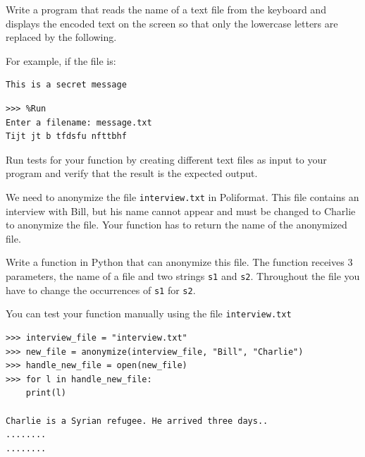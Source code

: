 \begin{exercise}
Write a program that reads the name of a text file from the keyboard and displays the encoded text on the screen so that only the lowercase letters are replaced by the following.

For example, if the file is:

\begin{Verbatim}[frame=single, label={\em message.txt}]
This is a secret message
\end{Verbatim}


\begin{Verbatim}[frame=single]
>>> %Run 
Enter a filename: message.txt
Tijt jt b tfdsfu nfttbhf
\end{Verbatim}

Run tests for your function by creating different text files as input to your program and verify that the result is the expected output.



\end{exercise}


\begin{exercise}
We need to anonymize the file \texttt{interview.txt} in Poliformat. This file contains an interview with Bill, but his name cannot appear and must be changed to Charlie to anonymize the file. Your function has to return the name of the anonymized file.


Write a  function in Python that can anonymize this file. The function receives 3 parameters, the name of a file and two strings \texttt{s1} and \texttt{s2}. Throughout the file you have to change the occurrences of \texttt{s1} for \texttt{s2}.

You can test your function manually using the file \texttt{interview.txt}

\begin{Verbatim}[frame=single]
>>> interview_file = "interview.txt"
>>> new_file = anonymize(interview_file, "Bill", "Charlie")
>>> handle_new_file = open(new_file)
>>> for l in handle_new_file:
    print(l)
    
Charlie is a Syrian refugee. He arrived three days..
........
........
\end{Verbatim}
\end{exercise}


